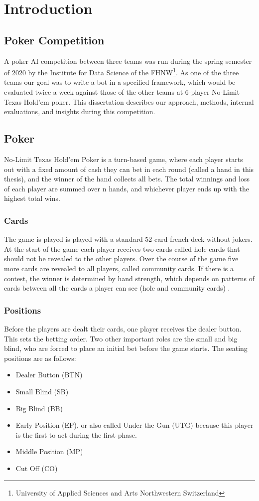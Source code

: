 \chapter{Introduction}
\section{Poker Competition}
A poker AI competition between three teams was run during the spring semester of 2020 by the Institute for Data Science of the FHNW\footnote{University of Applied Sciences and Arts Northwestern Switzerland}. As one of the three teams our goal was to write a bot in a specified framework, which would be evaluated twice a week against those of the other teams at 6-player No-Limit Texas Hold'em poker. This dissertation describes our approach, methods, internal evaluations, and insights during this competition.

\section{Poker}
No-Limit Texas Hold'em Poker is a turn-based game, where each player starts out with a fixed amount of cash they can bet in each round (called a hand in this thesis), and the winner of the hand collects all bets. The total winnings and loss of each player are summed over n hands, and whichever player ends up with the highest total wins.

\subsection{Cards}
The game is played is played with a standard 52-card french deck without jokers. At the start of the game each player receives two cards called hole cards that should not be revealed to the other players. Over the course of the game five more cards are revealed to all players, called community cards. If there is a contest, the winner is determined by hand strength, which depends on patterns of cards between all the cards a player can see (hole and community cards) \cite{HoldemHandvalues}.

\subsection{Positions}
Before the players are dealt their cards, one player receives the dealer button. This sets the betting order. Two other important roles are the small and big blind, who are forced to place an initial bet before the game starts. The seating positions are as follows:
\begin{itemize}
    \item Dealer Button (BTN)
    \item Small Blind (SB)
    \item Big Blind (BB)
    \item Early Position (EP), or also called Under the Gun (UTG) because this player is the first to act during the first phase.
    \item Middle Position (MP)
    \item Cut Off (CO)
\end{itemize}

